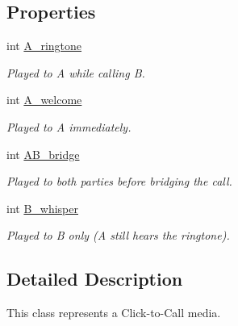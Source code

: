 \subsection*{Properties}
\begin{DoxyCompactItemize}
\item 
int \hyperlink{class_thecallr_api_1_1_objects_1_1_click_to_call_1_1_click_to_call_media_ab0c3d537dbb8696f5dc380996c06e990}{A\+\_\+ringtone}
\begin{DoxyCompactList}\small\item\em Played to A while calling B. \end{DoxyCompactList}\item 
int \hyperlink{class_thecallr_api_1_1_objects_1_1_click_to_call_1_1_click_to_call_media_aacad81f654abd19afa10bee0452cb2ea}{A\+\_\+welcome}
\begin{DoxyCompactList}\small\item\em Played to A immediately. \end{DoxyCompactList}\item 
int \hyperlink{class_thecallr_api_1_1_objects_1_1_click_to_call_1_1_click_to_call_media_a0ad99a629b6b99d92744ccb3cbe19349}{A\+B\+\_\+bridge}
\begin{DoxyCompactList}\small\item\em Played to both parties before bridging the call. \end{DoxyCompactList}\item 
int \hyperlink{class_thecallr_api_1_1_objects_1_1_click_to_call_1_1_click_to_call_media_a25ffb7b43ae4ca4072abc0cf931b0fdb}{B\+\_\+whisper}
\begin{DoxyCompactList}\small\item\em Played to B only (A still hears the ringtone). \end{DoxyCompactList}\end{DoxyCompactItemize}


\subsection{Detailed Description}
This class represents a Click-\/to-\/\+Call media. 



